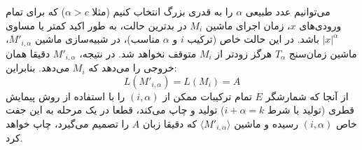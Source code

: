 می‌توانیم عدد طبیعی $\alpha$ را به قدری بزرگ انتخاب کنیم (مثلا $\alpha > c$) که برای تمام ورودی‌های $x$، زمان اجرای ماشین $M_i$ در بدترین حالت، به طور اکید کمتر یا مساوی $|x|^\alpha$ باشد.
در این حالت خاص (ترکیب $i$ و $\alpha$ مناسب)، در شبیه‌سازی ماشین $M'_{i, \alpha}$، ماشین زمان‌سنج $T_\alpha$ هرگز زودتر از $M_i$ متوقف نخواهد شد. در نتیجه، $M'_{i, \alpha}$ دقیقا همان خروجی را می‌دهد که $M_i$ می‌دهد. بنابراین:
$$L(M'_{i, \alpha}) = L(M_i) = A$$
از آنجا که شمارشگر $E$ تمام ترکیبات ممکن از $(i, \alpha)$ را با استفاده از روش پیمایش قطری (تولید با شرط $i + \alpha = k$) تولید و چاپ می‌کند، قطعا در یک مرحله به این جفت خاص $(i, \alpha)$ رسیده و ماشین $\langle M'_{i, \alpha} \rangle$ که دقیقا زبان $A$ را تصمیم می‌گیرد، چاپ خواهد کرد.